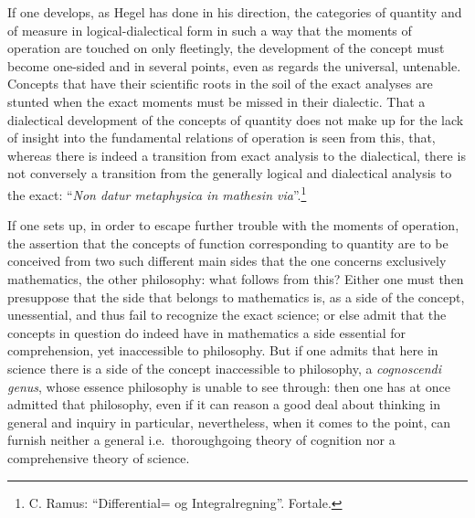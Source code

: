 \documentclass[12pt,a4paper,openany]{book}
\newcommand{\opage}[1]{\marginnote{\footnotesize\textit{[#1]}}}
\begin{document}
If one develops, as Hegel has done in his direction, the
categories of quantity and of measure in logical-dialectical form
in such a way that the moments of operation are touched on only fleetingly, the
development of the concept must become one-sided and in several points, even
as regards the universal, untenable. Concepts that
have their scientific roots in the soil of the exact analyses
are stunted when the exact moments must be missed in
their dialectic. That a dialectical development of the concepts of quantity
does not make up for the lack of insight into the fundamental relations of operation is seen from this, that, whereas there is
indeed a transition from exact analysis to the dialectical, there is
not conversely a transition from the generally logical and
dialectical analysis to the exact: ``\textit{Non datur metaphysica
in mathesin via}''.\footnote[1]{C. Ramus: ``Differential= og Integralregning''. Fortale.}

\setcounter{footnote}{0}%
\opage{26}If one sets up, in order to escape further trouble with
the moments of operation, the assertion that the concepts of function corresponding to quantity are to be conceived from two such different main sides that the one concerns exclusively
mathematics, the other philosophy: what follows
from this? Either one must then presuppose that the side that
belongs to mathematics is, as a side of the concept, unessential,
and thus fail to recognize the exact science; or else admit
that the concepts in question do indeed have in mathematics
a side essential for comprehension, yet inaccessible to philosophy.
But if one admits that here in
science there is a side of the concept inaccessible to philosophy, a \textit{cognoscendi genus}, whose essence philosophy
is unable to see through: then one has at once
admitted that philosophy, even if it can
reason a good deal about thinking in general and
inquiry in particular, nevertheless, when it comes
to the point, can furnish neither a general i.e.\ thoroughgoing
theory of cognition nor a comprehensive theory of science.
\end{document}
